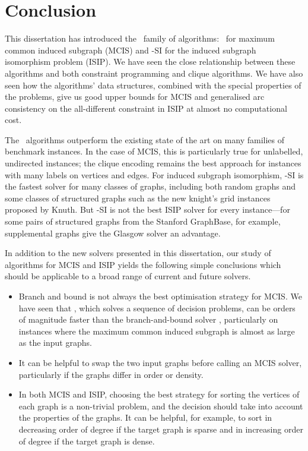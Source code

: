 \chapter{Conclusion}
\label{c:conclusion}

This dissertation has introduced the \McSplit\ family of algorithms: \McSplit\
for maximum common induced subgraph (MCIS) and \McSplit-SI for the induced
subgraph isomorphism problem (ISIP).  We have seen the close relationship
between these algorithms and both constraint programming and clique algorithms.
We have also seen how the algorithms' data structures, combined with the
special properties of the problems, give us good upper bounds for MCIS and
generalised arc consistency on the all-different constraint in ISIP at almost
no computational cost.

The \McSplit\ algorithms outperform
the existing state of the art on many families of benchmark instances.  In the
case of MCIS, this is particularly true for unlabelled, undirected instances;
the clique encoding remains the best approach for instances with many labels on
vertices and edges.  For induced subgraph isomorphism, \McSplit-SI is the
fastest solver for many classes of graphs, including both random graphs and
some classes of structured graphs such as the new knight's grid instances
proposed by Knuth.  But
\McSplit-SI is not the best ISIP solver for every instance---for some pairs of
structured graphs from the Stanford GraphBase, for example,
supplemental graphs give the Glasgow solver an advantage.

In addition to the new solvers presented in this dissertation,
our study of algorithms for MCIS and ISIP yields the following
simple conclusions which should be applicable to a broad
range of current and future solvers.

\begin{itemize}
    \item Branch and bound is not always the best optimisation strategy
        for MCIS. We have seen that \McSplitDown, which solves a sequence
        of decision problems, can be orders of magnitude faster than
        the branch-and-bound solver \McSplit, particularly on instances
        where the maximum common induced subgraph is almost as large as
        the input graphs.
    \item It can be helpful to swap the two input graphs before calling
        an MCIS solver, particularly if the graphs differ
        in order or density.
    \item In both MCIS and ISIP, choosing the best strategy for sorting the vertices
        of each graph is a non-trivial problem, and the decision
        should take into account the properties
        of the graphs.  It can be helpful, for example, to sort in decreasing
        order of degree if the target graph is sparse and in increasing order of
        degree if the target graph is dense.
\end{itemize}

